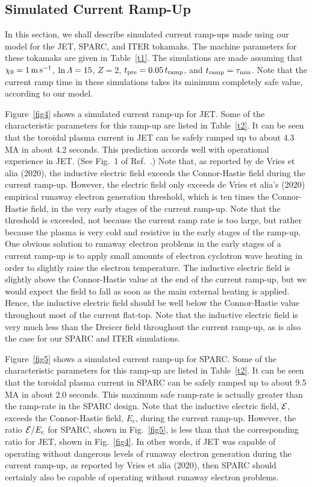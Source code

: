 \documentclass[12pt,prb,aps]{revtex4-1}
\begin{document}
\subsection{Simulated Current Ramp-Up}
In this section, we shall describe simulated current ramp-ups made using our model for the JET, SPARC, and ITER tokamaks. The
machine parameters for these tokamaks are given in Table~\ref{t1}. The simulations are made assuming that $\chi_0=1\,{\rm m\,s}^{-1}$,
$\ln{\mit\Lambda} = 15$, $Z=2$, $t_{\rm pre}= 0.05\,t_{\rm ramp}$, and $t_{\rm ramp} =\tau_{\rm min}$. Note that the current ramp time in these simulations takes its
minimum completely safe value, according to our model. 

Figure~\ref{fig4} shows a simulated current ramp-up for JET. Some of the characteristic  parameters for this ramp-up are listed in Table~\ref{t2}. 
It can be seen that the toroidal plasma current in JET can be safely ramped up to about 4.3 MA in about 4.2 seconds. This prediction accords well
with operational experience in JET. (See Fig.~1 of Ref.~.)
Note that, as reported by de Vries et alia (2020),\cite{run} the inductive electric field exceeds the Connor-Hastie field during the current ramp-up. However,
the electric field only exceeds de Vries et alia's (2020) empirical runaway electron generation threshold, which is ten times the Connor-Hastie field,\cite{run} in
the very early stages of the current ramp-up. Note that the threshold is exceeded, not because the current ramp  rate is too large, but rather because the
plasma is very cold and resistive in the early stages of the ramp-up. One obvious solution to runaway electron problems in the early
stages of a current ramp-up is to apply small amounts of electron cyclotron wave heating in order to slightly raise the electron temperature. 
The inductive electric field is slightly above the Connor-Hastie value at the end of the current ramp-up, but we would expect the field to
fall as soon as the main external heating is applied. Hence, the inductive electric field should be well below the Connor-Hastie
value throughout most of the current flat-top. Note that the inductive electric field is very much less than the Dreicer field throughout the current ramp-up, as is also
the case for our SPARC and ITER simulations. 

Figure~\ref{fig5} shows a simulated current ramp-up for SPARC. Some of the characteristic  parameters for this ramp-up are listed in Table~\ref{t2}. 
It can be seen that the toroidal plasma current in SPARC can be safely ramped up to about 9.5 MA in about 2.0 seconds. This maximum safe ramp-rate is 
actually greater than the ramp-rate in the SPARC design.\cite{creely} 
Note that the inductive electric field, ${\cal E}$,  exceeds the Connor-Hastie field, $E_c$,  during the current ramp-up. However, the ratio ${\cal E}/E_c$ for SPARC,
shown  in Fig.~\ref{fig5}, is less than that the corresponding ratio for JET,  shown in Fig.~\ref{fig4}. In other words, if JET was capable of
operating without dangerous levels of runaway electron generation during the current ramp-up, as reported by  Vries et alia (2020),\cite{run} then SPARC
should certainly also be capable of operating without runaway electron problems. 
\end{document}
